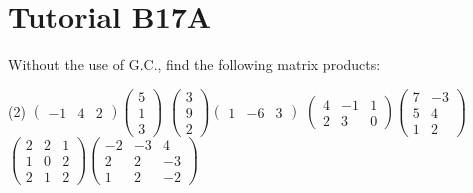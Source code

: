 \section{Tutorial B17A}

\begin{problem}
    Without the use of G.C., find the following matrix products:
    \begin{tasks}(2)
        \task $\begin{pmatrix}
            -1 & 4 & 2
        \end{pmatrix}
        \begin{pmatrix}
            5\\
            1\\
            3
        \end{pmatrix}$
        \task $\begin{pmatrix}
            3\\
            9\\
            2
        \end{pmatrix}
        \begin{pmatrix}
            1 & -6 & 3
        \end{pmatrix}$
        \task $\begin{pmatrix}
            4 & -1 & 1\\2&3&0
        \end{pmatrix}
        \begin{pmatrix}
            7 & -3\\
            5 & 4\\
            1 & 2
        \end{pmatrix}$
        \task $\begin{pmatrix}
            2 & 2 & 1\\1 & 0 & 2\\2 & 1 & 2
        \end{pmatrix}
        \begin{pmatrix}
            -2 & -3 & 4\\2 & 2 & -3\\1 & 2 & -2
        \end{pmatrix}$
    \end{tasks}
\end{problem}
